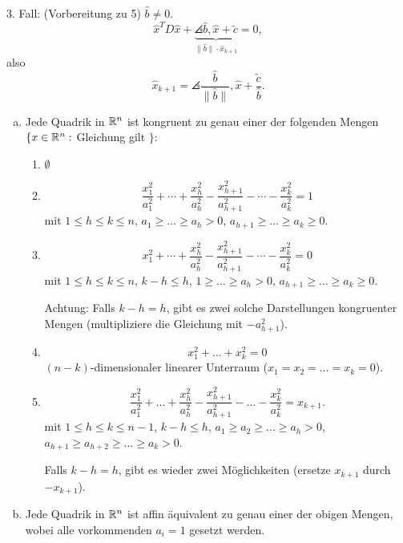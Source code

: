 \documentclass[
 a4paper,
 12pt,
 parskip=half
 ]{scrartcl}
\theoremstyle{plain}
\theoremstyle{definition}
\begin{document}
3. Fall: (Vorbereitung zu 5) $\hat{b} \ne 0$.
\[ \hat{x}^T D \hat{x} + \underbrace{\angles{\hat{b},\hat{x}}  + \tilde{c}}_{\| \hat{b} \| \cdot \hat{x}_{k+1}} = 0, \]
also
\[ \hat{x}_{k+1} = \angles{ \frac{\hat{b}}{\| \hat{b} \|}, \hat{x}} +
  \frac{\tilde{c}}{\hat{b}}. \]

\clearpage

\begin{thm}
  \begin{enumerate}[a)]
    \item Jede Quadrik in $\mathbb{R}^n$ ist kongruent zu genau einer der folgenden
      Mengen $\{x \in \mathbb{R}^n : $ Gleichung gilt $\}$:
      \begin{enumerate}[1)]
        \item $\emptyset$
        \item
          \[ \frac{x_1^2}{a_1^2} + \cdots + \frac{x_h^2}{a_h^2} -
            \frac{x_{h+1}^2}{a_{h+1}^2} - \cdots - \frac{x_k^2}{a_k^2} = 1 \]
          mit $1 \le h \le k \le n$, $a_1 \ge \ldots \ge a_h > 0$, $a_{h+1} \ge
          \ldots \ge a_k \ge 0$.
        \item
          \[ x_1^2 + \cdots + \frac{x_h^2}{a_h^2} -
            \frac{x_{h+1}^2}{a_{h+1}^2} - \cdots - \frac{x_k^2}{a_k^2} = 0 \]
          mit $1 \le h \le k \le n$, $k-h \le h$, $1 \ge \ldots \ge a_h > 0$, $a_{h+1} \ge \ldots \ge a_k \ge 0$.

          Achtung: Falls $k-h=h$, gibt es zwei solche Darstellungen kongruenter
          Mengen (multipliziere die Gleichung mit $-a_{h+1}^2$).
        \item
          \[ x_1^2 + \ldots + x_k^2 = 0 \]
          $(n-k)$-dimensionaler linearer Unterraum ($x_1 = x_2 =  \ldots = x_k =
          0$). 
        \item
          \[  \frac{x_1^2}{a_1^2} + \ldots + \frac{x_h^2}{a_h^2} -
            \frac{x_{h+1}^2}{a_{h+1}^2} - \ldots - \frac{x_k^2}{a_k^2} =
            x_{k+1}. \] 
          mit $1 \le h \le k \le n-1$, $k-h \le h$, $a_1 \ge a_2 \ge \ldots \ge
          a_h > 0$, $a_{h+1} \ge a_{h+2} \ge \ldots \ge a_k > 0$.

          Falls $k-h = h$, gibt es wieder  zwei Möglichkeiten (ersetze $x_{k+1}$
          durch $-x_{k+1}$).
    \end{enumerate}
    \item Jede Quadrik in $\mathbb{R}^n$ ist affin äquivalent zu genau einer der
      obigen Mengen, wobei alle vorkommenden $a_i = 1$ gesetzt werden.
  \end{enumerate}
\end{thm}
\end{document}
